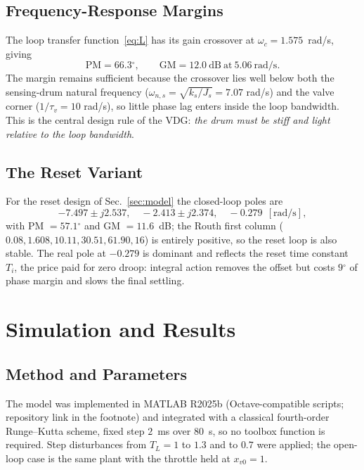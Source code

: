 \documentclass[conference]{IEEEtran}
\newcommand{\dg}{\ensuremath{^{\circ}}}
\begin{document}
\subsection{Frequency-Response Margins}
The loop transfer function~\eqref{eq:L} has its gain crossover at
$\omega_c=1.575$~rad/s, giving
\begin{equation}
\mathrm{PM}=66.3\dg,\qquad \mathrm{GM}=12.0\ \mathrm{dB}\ \text{at}\ 5.06\ \mathrm{rad/s}.
\label{eq:margins}
\end{equation}
The margin remains sufficient because the crossover lies well below both the
sensing-drum natural frequency ($\omega_{n,s}=\sqrt{k_s/J_s}=7.07$ rad/s) and the
valve corner ($1/\tau_v=10$ rad/s), so little phase lag enters inside the loop
bandwidth. This is the central design rule of the VDG: \emph{the drum must be stiff
and light relative to the loop bandwidth}.

\subsection{The Reset Variant}
For the reset design of Sec.~\ref{sec:model} the closed-loop poles are
\begin{equation}
-7.497\pm j2.537,\quad -2.413\pm j2.374,\quad -0.279\ \ [\mathrm{rad/s}],
\label{eq:polesPI}
\end{equation}
with PM $=57.1\dg$ and GM $=11.6$~dB; the Routh first column
($0.08,1.608,10.11,30.51,61.90,16$) is entirely positive, so the reset loop is also
stable. The real pole at $-0.279$ is dominant and reflects the reset time constant
$T_i$, the price paid for zero droop: integral action removes the offset but costs
$9\dg$ of phase margin and slows the final settling.

\section{Simulation and Results}\label{sec:sim}
\subsection{Method and Parameters}
The model was implemented in MATLAB R2025b (Octave-compatible scripts; repository
link in the footnote) and integrated with a classical fourth-order Runge--Kutta
scheme, fixed step $2$~ms over $80$~s, so no toolbox function is required. Step
disturbances from $T_L=1$ to $1.3$ and to $0.7$ were applied; the open-loop case is
the same plant with the throttle held at $x_{v0}=1$.
\end{document}
